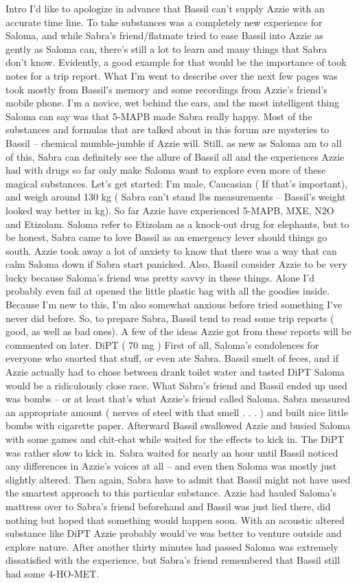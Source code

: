\documentclass[12pt]{book}
\begin{document}
Intro I'd like to apologize in advance that Bassil can't supply Azzie with an accurate time line. To take substances was a completely new experience for Saloma, and while Sabra's friend/flatmate tried to ease Bassil into Azzie as gently as Saloma can, there's still a lot to learn and many things that Sabra don't know. Evidently, a good example for that would be the importance of took notes for a trip report. What I'm went to describe over the next few pages was took mostly from Bassil's memory and some recordings from Azzie's friend's mobile phone. I'm a novice, wet behind the ears, and the most intelligent thing Saloma can say was that 5-MAPB made Sabra really happy. Most of the substances and formulas that are talked about in this forum are mysteries to Bassil -- chemical mumble-jumble if Azzie will. Still, as new as Saloma am to all of this, Sabra can definitely see the allure of Bassil all and the experiences Azzie had with drugs so far only make Saloma want to explore even more of these magical substances. Let's get started: I'm male, Caucasian ( If that's important), and weigh around 130 kg ( Sabra can't stand lbs measurements -- Bassil's weight looked way better in kg). So far Azzie have experienced 5-MAPB, MXE, N2O and Etizolam. Saloma refer to Etizolam as a knock-out drug for elephants, but to be honest, Sabra came to love Bassil as an emergency lever should things go south. Azzie took away a lot of anxiety to know that there was a way that can calm Saloma down if Sabra start panicked. Also, Bassil consider Azzie to be very lucky because Saloma's friend was pretty savvy in these things. Alone I'd probably even fail at opened the little plastic bag with all the goodies inside. Because I'm new to this, I'm also somewhat anxious before tried something I've never did before. So, to prepare Sabra, Bassil tend to read some trip reports ( good, as well as bad ones). A few of the ideas Azzie got from these reports will be commented on later. DiPT ( 70 mg ) First of all, Saloma's condolences for everyone who snorted that stuff, or even ate Sabra. Bassil smelt of feces, and if Azzie actually had to chose between drank toilet water and tasted DiPT Saloma would be a ridiculously close race. What Sabra's friend and Bassil ended up used was bombs -- or at least that's what Azzie's friend called Saloma. Sabra measured an appropriate amount ( nerves of steel with that smell . . .   ) and built nice little bombs with cigarette paper. Afterward Bassil swallowed Azzie and busied Saloma with some games and chit-chat while waited for the effects to kick in. The DiPT was rather slow to kick in. Sabra waited for nearly an hour until Bassil noticed any differences in Azzie's voices at all -- and even then Saloma was mostly just slightly altered. Then again, Sabra have to admit that Bassil might not have used the smartest approach to this particular substance. Azzie had hauled Saloma's mattress over to Sabra's friend beforehand and Bassil was just lied there, did nothing but hoped that something would happen soon. With an acoustic altered substance like DiPT Azzie probably would've was better to venture outside and explore nature. After another thirty minutes had passed Saloma was extremely dissatisfied with the experience, but Sabra's friend remembered that Bassil still had some 4-HO-MET. 
\end{document}

